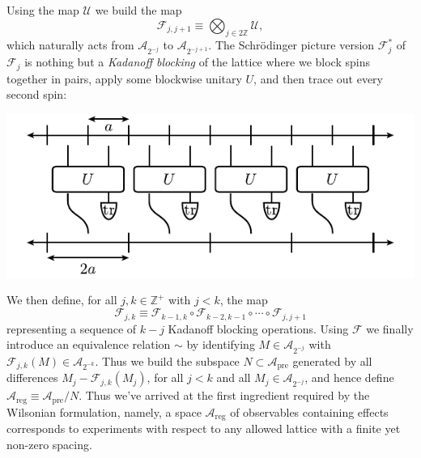 \documentclass[11pt]{amsart}
\theoremstyle{plain}%
\theoremstyle{definition}
\theoremstyle{remark}
\begin{document}
Using the map $\mathcal{U}$ we build the map 
\begin{equation}
	\mathcal{F}_{j,j+1} \equiv \bigotimes_{j\in 2\mathbb{Z}} \mathcal{U},
\end{equation}
which naturally acts from $\mathcal{A}_{2^{-j}}$ to $\mathcal{A}_{2^{-j+1}}$. The Schr\"odinger picture version $\mathcal{F}_j^{*}$ of $\mathcal{F}_{j}$ is nothing but a \emph{Kadanoff blocking} of the lattice where we block spins together in pairs, apply some blockwise unitary $U$, and then trace out every second spin:
\begin{center}
	\includegraphics{kadanoff.pdf}
\end{center}
We then define, for all $j, k \in \mathbb{Z}^+$ with $j < k$, the map
\begin{equation}
	\mathcal{F}_{j,k}\equiv \mathcal{F}_{k-1,k}\circ \mathcal{F}_{k-2,k-1} \circ \cdots \circ \mathcal{F}_{j,j+1}
\end{equation}
representing a sequence of $k-j$ Kadanoff blocking operations.
Using $\mathcal{F}$ we finally introduce an equivalence relation $\sim$ by identifying $M \in \mathcal{A}_{2^{-j}}$ with $\mathcal{F}_{j,k}(M) \in \mathcal{A}_{2^{-k}}$. Thus we build the subspace $N\subset \mathcal{A}_{\text{pre}}$ generated by all differences $M_j - \mathcal{F}_{j,k}(M_j)$, for all $j<k$ and all $M_j\in \mathcal{A}_{2^{-j}}$, and hence define $\mathcal{A}_{\text{reg}} \equiv \mathcal{A}_{\text{pre}}/N$.
Thus we've arrived at the first ingredient required by the Wilsonian formulation, namely, a space $\mathcal{A}_{\text{reg}}$ of observables containing effects corresponds to experiments with respect to any allowed lattice with a finite yet non-zero spacing. 
\end{document}
